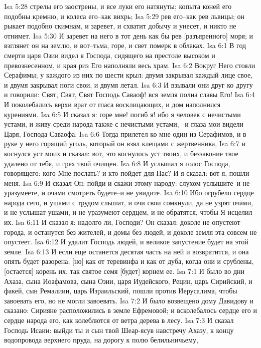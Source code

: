 Isa 5:28  стрелы его заострены, и все луки его натянуты; копыта коней его подобны кремню, и колеса его--как вихрь;
Isa 5:29  рев его--как рев львицы; он рыкает подобно скимнам, и заревет, и схватит добычу и унесет, и никто не отнимет.
Isa 5:30  И заревет на него в тот день как бы рев [разъяренного] моря; и взглянет он на землю, и вот--тьма, горе, и свет померк в облаках.
Isa 6:1  В год смерти царя Озии видел я Господа, сидящего на престоле высоком и превознесенном, и края риз Его наполняли весь храм.
Isa 6:2  Вокруг Него стояли Серафимы; у каждого из них по шести крыл: двумя закрывал каждый лице свое, и двумя закрывал ноги свои, и двумя летал.
Isa 6:3  И взывали они друг ко другу и говорили: Свят, Свят, Свят Господь Саваоф! вся земля полна славы Его!
Isa 6:4  И поколебались верхи врат от гласа восклицающих, и дом наполнился курениями.
Isa 6:5  И сказал я: горе мне! погиб я! ибо я человек с нечистыми устами, и живу среди народа также с нечистыми устами, --и глаза мои видели Царя, Господа Саваофа.
Isa 6:6  Тогда прилетел ко мне один из Серафимов, и в руке у него горящий уголь, который он взял клещами с жертвенника,
Isa 6:7  и коснулся уст моих и сказал: вот, это коснулось уст твоих, и беззаконие твое удалено от тебя, и грех твой очищен.
Isa 6:8  И услышал я голос Господа, говорящего: кого Мне послать? и кто пойдет для Нас? И я сказал: вот я, пошли меня.
Isa 6:9  И сказал Он: пойди и скажи этому народу: слухом услышите--и не уразумеете, и очами смотреть будете--и не увидите.
Isa 6:10  Ибо огрубело сердце народа сего, и ушами с трудом слышат, и очи свои сомкнули, да не узрят очами, и не услышат ушами, и не уразумеют сердцем, и не обратятся, чтобы Я исцелил их.
Isa 6:11  И сказал я: надолго ли, Господи? Он сказал: доколе не опустеют города, и останутся без жителей, и домы без людей, и доколе земля эта совсем не опустеет.
Isa 6:12  И удалит Господь людей, и великое запустение будет на этой земле.
Isa 6:13  И если еще останется десятая часть на ней и возвратится, и она опять будет разорена; [но] как от теревинфа и как от дуба, когда они и срублены, [остается] корень их, так святое семя [будет] корнем ее.
Isa 7:1  И было во дни Ахаза, сына Иоафамова, сына Озии, царя Иудейского, Рецин, царь Сирийский, и факей, сын Ремалиин, царь Израильский, пошли против Иерусалима, чтобы завоевать его, но не могли завоевать.
Isa 7:2  И было возвещено дому Давидову и сказано: Сирияне расположились в земле Ефремовой; и всколебалось сердце его и сердце народа его, как колеблются от ветра дерева в лесу.
Isa 7:3  И сказал Господь Исаии: выйди ты и сын твой Шеар-ясув навстречу Ахазу, к концу водопровода верхнего пруда, на дорогу к полю белильничьему,
